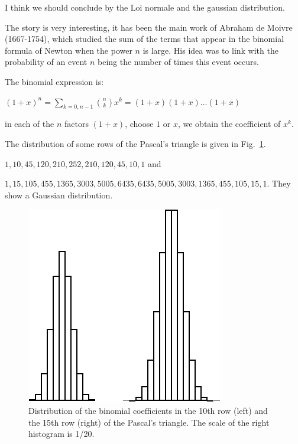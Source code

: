 \medskip

\noindent {}
\bigskip

I think we should conclude by the Loi normale and the gaussian distribution. 

The story is very interesting, it has been the main work of Abraham de Moivre (1667-1754), 
which studied the sum of the terms that appear in the binomial formula of Newton when the power $n$ is large.
His idea was to link with the probability of an event $n$ being the number of times this event occurs.

The binomial expression is:

$(1+x)^n = \sum_{k=0,n-1} {n \choose k} x^k = (1+x)(1+x)\ldots(1+x)$

in each of the $n$ factors $(1+x)$, choose $1$ or $x$, we obtain the coefficient of $x^k$.

\medskip

The distribution of some rows of the Pascal's triangle is given in Fig.~\ref{fig:gaussiandistribution}.

$1,10,45,120,210,252,210,120,45,10,1$ and

$1,15,105,455,1365,3003,5005,6435,6435,5005,3003,1365,455,105,15,1$.
They show a Gaussian distribution.
\begin{figure}[h]
\begin{center}
        \includegraphics[scale=0.5]{FiguresMaths/ProbaGaussianDistribution}
        \caption{Distribution of the binomial coefficients in the 10th row (left) and the 15th row (right) of the Pascal's triangle.
        The scale of the right histogram is 1/20.}
        \label{fig:gaussiandistribution}
\end{center}
\end{figure}


